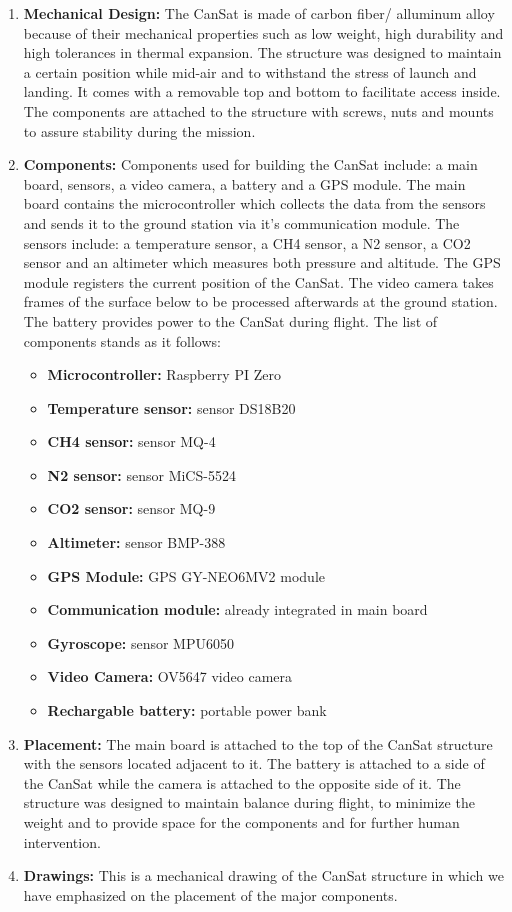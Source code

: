 \documentclass[11pt]{article}
\begin{document}
\begin{enumerate}
\item \textbf{Mechanical Design:} The CanSat is made of carbon fiber/ alluminum alloy because of their mechanical properties such as low weight, high durability and high tolerances in thermal expansion. The structure was designed to maintain a certain position while mid-air and to withstand the stress of launch and landing. It comes with a removable top and bottom to facilitate access inside. The components are attached to the structure with screws, nuts and mounts to assure stability during the mission.
\vspace{0.25cm}
\item \textbf{Components:} Components used for building the CanSat include: a main board, sensors, a video camera, a battery and a GPS module. The main board contains the microcontroller which collects the data from the sensors and sends it to the ground station via it’s communication module. The sensors include: a temperature sensor, a CH4 sensor, a N2 sensor, a CO2 sensor and an altimeter which measures both pressure and altitude. The GPS module registers the current position of the CanSat. The video camera takes frames of the surface below to be processed afterwards at the ground station. The battery provides power to the CanSat during flight. The list of components stands as it follows:

\begin{itemize}
\item \textbf{Microcontroller:} Raspberry PI Zero
\item \textbf{Temperature sensor:} sensor DS18B20
\item \textbf{CH4 sensor:} sensor MQ-4
\item \textbf{N2 sensor:} sensor MiCS-5524
\item \textbf{CO2 sensor:} sensor MQ-9
\item \textbf{Altimeter:} sensor BMP-388
\item \textbf{GPS Module:} GPS GY-NEO6MV2 module
\item \textbf{Communication module:} already integrated in main board
\item \textbf{Gyroscope:} sensor MPU6050
\item \textbf{Video Camera:} OV5647 video camera
\item \textbf{Rechargable battery:} portable power bank
\end{itemize}

\item \textbf{Placement:} The main board is attached to the top of the CanSat structure with the sensors located adjacent to it. The battery is attached to a side of the CanSat while the camera is attached to the opposite side of it. The structure was designed to maintain balance during flight, to minimize the weight and to provide space for the components and for further human intervention.
\vspace{0.25cm}
\item \textbf{Drawings:} This is a mechanical drawing of the CanSat structure in which we have emphasized on the placement of the major components.


\end{enumerate}
\end{document}

